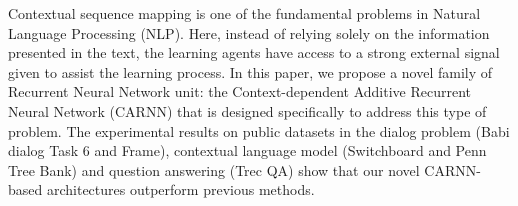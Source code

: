 Contextual sequence mapping is one of the fundamental problems in Natural Language Processing (NLP). Here, instead of relying solely on the information presented in the text, the learning agents have access to a strong external signal given to assist the learning process. In this paper, we propose a novel family of Recurrent Neural Network unit: the Context-dependent Additive Recurrent Neural Network (CARNN) that is designed specifically to address this type of problem. The experimental results on public datasets in the dialog problem (Babi dialog Task 6 and Frame), contextual language model (Switchboard and Penn Tree Bank) and question answering (Trec QA) show that our novel CARNN-based architectures outperform previous methods.
